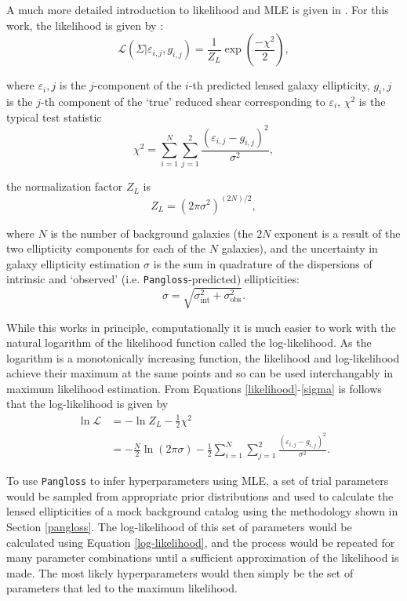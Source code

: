 \documentclass[%
 reprint,
 amsmath,amssymb,
 aps,nofootinbib
]{revtex4-1}
\begin{document}
A much more detailed introduction to likelihood and MLE is given in \cite{bayes_in_sky}. For this work, the likelihood is given by \cite{marshall_thesis}:
\begin{equation}\label{likelihood}
\mathcal{L}(\Sigma|\varepsilon_{i,j},g_{i,j})=\frac{1}{Z_L}\exp\left(\frac{-\chi^2}{2}\right),
\end{equation}

\noindent where $\varepsilon_i,j$ is the $j$-component of the $i$-th predicted lensed galaxy ellipticity, $g_i,j$ is the $j$-th component of the `true' reduced shear corresponding to $\varepsilon_i$, $\chi^2$ is the typical test statistic
\begin{equation}\label{chi2}
\chi^2=\sum_{i=1}^N\sum_{j=1}^2\frac{(\varepsilon_{i,j}-g_{i,j})^2}{\sigma^2},
\end{equation}

\noindent the normalization factor $Z_L$ is
\begin{equation}
Z_L=(2\pi\sigma^2)^{(2N)/2},
\end{equation}

\noindent where $N$ is the number of background galaxies (the $2N$ exponent is a result of the two ellipticity components for each of the $N$ galaxies), and the uncertainty in galaxy ellipticity estimation $\sigma$ is the sum in quadrature of the dispersions of intrinsic and `observed' (i.e. \texttt{Pangloss}-predicted) ellipticities:
\begin{equation}\label{sigma}
\sigma=\sqrt{\sigma_{\text{int}}^2+\sigma_{\text{obs}}^2}.
\end{equation}

While this works in principle, computationally it is much easier to work with the natural logarithm of the likelihood function called the log-likelihood. As the logarithm is a monotonically increasing function, the likelihood and log-likelihood achieve their maximum at the same points and so can be used interchangably in maximum likelihood estimation. From Equations \eqref{likelihood}-\eqref{sigma} is follows that the log-likelihood is given by
\begin{align}\label{log-likelihood}
\ln\mathcal{L}&=-\ln Z_L-\frac{1}{2}\chi^2\nonumber \\
&=-\frac{N}{2}\ln(2\pi\sigma)-\frac{1}{2}\sum_{i=1}^N\sum_{j=1}^2\frac{(\varepsilon_{i,j}-g_{i,j})^2}{\sigma^2}.
\end{align}

To use \texttt{Pangloss} to infer hyperparameters using MLE, a set of trial parameters would be sampled from appropriate prior distributions and used to calculate the lensed ellipticities of a mock background catalog using the methodology shown in Section \ref{pangloss}. The log-likelihood of this set of parameters would be calculated using Equation \eqref{log-likelihood}, and the process would be repeated for many parameter combinations until a sufficient approximation of the likelihood is made. The most likely hyperparameters would then simply be the set of parameters that led to the maximum likelihood.
\end{document}
